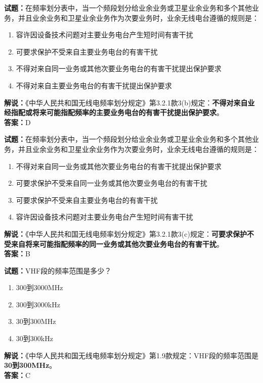 \documentclass{ctexbook}
\begin{document}
\bigskip


\noindent\textbf{试题：}在频率划分表中，当一个频段划分给业余业务或卫星业余业务和多个其他业务，并且业余业务和卫星业余业务作为次要业务时，业余无线电台遵循的规则是：
\begin{enumerate}[leftmargin=3em]
	\item 容许因设备技术问题对主要业务电台产生短时间有害干扰
	\item 可要求保护不受来自主要业务电台的有害干扰
	\item 不得对来自同一业务或其他次要业务电台的有害干扰提出保护要求
	\item 不得对来自主要业务电台的有害干扰提出保护要求
\end{enumerate}
\noindent\textbf{解说：}《中华人民共和国无线电频率划分规定》第3.2.1款3(b)规定：\textbf{不得对来自业经指配或将来可能指配频率的主要业务电台的有害干扰提出保护要求}。\\\textbf{答案：}D




\bigskip


\noindent\textbf{试题：}在频率划分表中，当一个频段划分给业余业务或卫星业余业务和多个其他业务，并且业余业务和卫星业余业务作为次要业务时，业余无线电台遵循的规则是：
\begin{enumerate}[leftmargin=3em]
	\item 不得对来自同一业务或其他次要业务电台的有害干扰提出保护要求
	\item 可要求保护不受来自同一业务或其他次要业务电台的有害干扰
	\item 可要求保护不受来自主要业务电台的有害干扰
	\item 容许因设备技术问题对主要业务电台产生短时间有害干扰
\end{enumerate}
\noindent\textbf{解说：}《中华人民共和国无线电频率划分规定》第3.2.1款3(c)规定：\textbf{可要求保护不受来自将来可能指配频率的同一业务或其他次要业务电台的有害干扰}。\\
\textbf{答案：}B




\bigskip


\noindent\textbf{试题：}VHF段的频率范围是多少？
\begin{enumerate}[leftmargin=3em]
	\item 300到3000MHz
	\item 300到3000kHz
	\item 30到300MHz
	\item 30到300kHz
\end{enumerate}
\noindent\textbf{解说：}《中华人民共和国无线电频率划分规定》第1.9款规定：VHF段的频率范围是\textbf{30到300MHz}。\\\noindent\textbf{答案：}C
\end{document}

